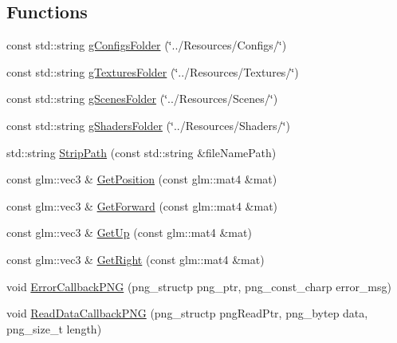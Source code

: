 \subsection*{Functions}
\begin{DoxyCompactItemize}
\item 
const std\-::string \hyperlink{namespacegl_af5836b3529871ab4fc09af0a394c45e1}{g\-Configs\-Folder} (\char`\"{}../Resources/Configs/\char`\"{})
\item 
const std\-::string \hyperlink{namespacegl_a8ae293cd338717930453aa0b9ffc69bc}{g\-Textures\-Folder} (\char`\"{}../Resources/Textures/\char`\"{})
\item 
const std\-::string \hyperlink{namespacegl_aa9df753e0c2987d57550ab72ec9c964d}{g\-Scenes\-Folder} (\char`\"{}../Resources/Scenes/\char`\"{})
\item 
const std\-::string \hyperlink{namespacegl_a3eb61334b6c98adebcd09206a8fca0d2}{g\-Shaders\-Folder} (\char`\"{}../Resources/Shaders/\char`\"{})
\item 
std\-::string \hyperlink{namespacegl_aed3aca6a157ef77d31fd645d63bb3bbe}{Strip\-Path} (const std\-::string \&file\-Name\-Path)
\item 
const glm\-::vec3 \& \hyperlink{namespacegl_a4b22b2879b24e388452e930345a4cb37}{Get\-Position} (const glm\-::mat4 \&mat)
\item 
const glm\-::vec3 \& \hyperlink{namespacegl_ac54480c43577b06b69f6f2fdbab4d1c5}{Get\-Forward} (const glm\-::mat4 \&mat)
\item 
const glm\-::vec3 \& \hyperlink{namespacegl_a8435e4a74113d2a44a7ec9918fd0b7cc}{Get\-Up} (const glm\-::mat4 \&mat)
\item 
const glm\-::vec3 \& \hyperlink{namespacegl_afd7c49eb05f519611109ae40219d17fa}{Get\-Right} (const glm\-::mat4 \&mat)
\item 
void \hyperlink{namespacegl_a6a0f77938f6934898e42773bbbad479b}{Error\-Callback\-P\-N\-G} (png\-\_\-structp png\-\_\-ptr, png\-\_\-const\-\_\-charp error\-\_\-msg)
\item 
void \hyperlink{namespacegl_a35af4bc1afee30a4d4613a1dd3afce65}{Read\-Data\-Callback\-P\-N\-G} (png\-\_\-structp png\-Read\-Ptr, png\-\_\-bytep data, png\-\_\-size\-\_\-t length)
\end{DoxyCompactItemize}
